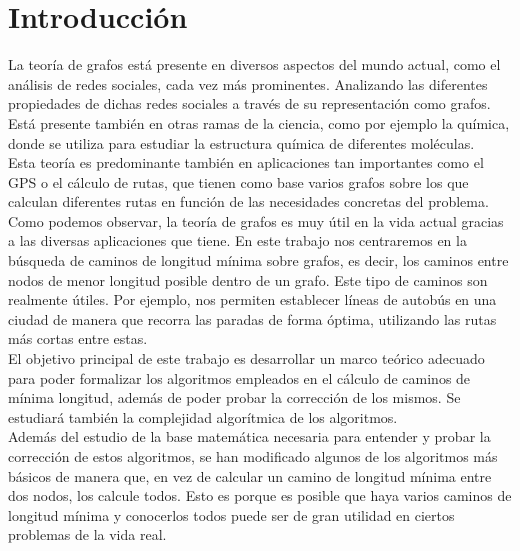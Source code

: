 %


\chapter{Introducción}

La teoría de grafos está presente en diversos aspectos del mundo actual, como el análisis de redes sociales, cada vez más prominentes. Analizando las diferentes propiedades de dichas redes sociales a través de su representación como grafos. Está presente también en otras ramas de la ciencia, como por ejemplo la química, donde se utiliza para estudiar la estructura química de diferentes moléculas. \\

Esta teoría es predominante también en aplicaciones tan importantes como el GPS o el cálculo de rutas, que tienen como base varios grafos sobre los que calculan diferentes rutas en función de las necesidades concretas del problema. \\

Como podemos observar, la teoría de grafos es muy útil en la vida actual gracias a las diversas aplicaciones que tiene. En este trabajo nos centraremos en la búsqueda de caminos de longitud mínima sobre grafos, es decir, los caminos entre nodos de menor longitud posible dentro de un grafo. Este tipo de caminos son realmente útiles. Por ejemplo, nos permiten establecer líneas de autobús en una ciudad de manera que recorra las paradas de forma óptima, utilizando las rutas más cortas entre estas. \\

El objetivo principal de este trabajo es desarrollar un marco teórico adecuado para poder formalizar los algoritmos empleados en el cálculo de caminos de mínima longitud, además de poder probar la corrección de los mismos. Se estudiará también la complejidad algorítmica de los algoritmos. \\

Además del estudio de la base matemática necesaria para entender y probar la corrección de estos algoritmos, se han modificado algunos de los algoritmos más básicos de manera que, en vez de calcular un camino de longitud mínima entre dos nodos, los calcule todos. Esto es porque es posible que haya varios caminos de longitud mínima y conocerlos todos puede ser de gran utilidad en ciertos problemas de la vida real. \\

